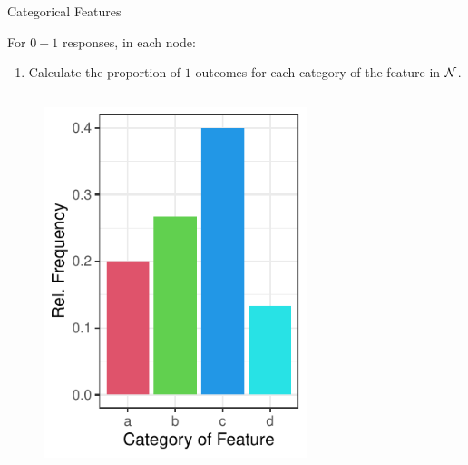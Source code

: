 \documentclass[11pt,compress,t,notes=noshow, xcolor=table]{beamer}
\begin{document}
  \begin{frame}{Categorical Features}

For $0-1$ responses, in each node:
  \begin{enumerate}
  \item Calculate the proportion of $1$-outcomes for each category of the feature in $\mathcal{N}$.

  \end{enumerate}
  \begin{columns}
  \begin{column}{0.33\textwidth}
  \begin{figure}
  \includegraphics[width=0.8\textwidth]{figure/categoryplot-binary1.pdf}
  \end{figure}
  \end{column}
  \begin{column}{0.33\textwidth}
  \lz
  \end{column}
  \begin{column}{0.33\textwidth}
  \lz
  \end{column}
  \end{columns}

\end{frame}
\end{document}
